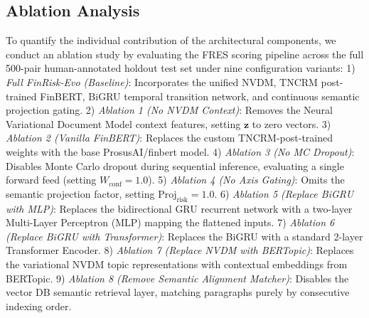 \documentclass[journal]{IEEEtran}
\begin{document}
\begin{table}[t]
\centering
\caption{Decomposition of FRES Multiplicative Scoring Factors}
\label{tab:fres_decomp}
\end{table}

\subsection{Ablation Analysis}
To quantify the individual contribution of the architectural components, we conduct an ablation study by evaluating the FRES scoring pipeline across the full 500-pair human-annotated holdout test set under nine configuration variants:
1) \textit{Full FinRisk-Evo (Baseline)}: Incorporates the unified NVDM, TNCRM post-trained FinBERT, BiGRU temporal transition network, and continuous semantic projection gating.
2) \textit{Ablation 1 (No NVDM Context)}: Removes the Neural Variational Document Model context features, setting $\mathbf{z}$ to zero vectors.
3) \textit{Ablation 2 (Vanilla FinBERT)}: Replaces the custom TNCRM-post-trained weights with the base ProsusAI/finbert model.
4) \textit{Ablation 3 (No MC Dropout)}: Disables Monte Carlo dropout during sequential inference, evaluating a single forward feed (setting $W_{\text{conf}} = 1.0$).
5) \textit{Ablation 4 (No Axis Gating)}: Omits the semantic projection factor, setting $\text{Proj}_{\text{risk}} = 1.0$.
6) \textit{Ablation 5 (Replace BiGRU with MLP)}: Replaces the bidirectional GRU recurrent network with a two-layer Multi-Layer Perceptron (MLP) mapping the flattened inputs.
7) \textit{Ablation 6 (Replace BiGRU with Transformer)}: Replaces the BiGRU with a standard 2-layer Transformer Encoder.
8) \textit{Ablation 7 (Replace NVDM with BERTopic)}: Replaces the variational NVDM topic representations with contextual embeddings from BERTopic.
9) \textit{Ablation 8 (Remove Semantic Alignment Matcher)}: Disables the vector DB semantic retrieval layer, matching paragraphs purely by consecutive indexing order.
\end{document}
